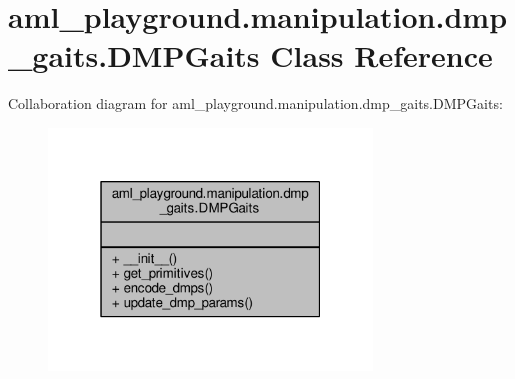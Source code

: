 \hypertarget{classaml__playground_1_1manipulation_1_1dmp__gaits_1_1_d_m_p_gaits}{\section{aml\-\_\-playground.\-manipulation.\-dmp\-\_\-gaits.\-D\-M\-P\-Gaits Class Reference}
\label{classaml__playground_1_1manipulation_1_1dmp__gaits_1_1_d_m_p_gaits}
}


Collaboration diagram for aml\-\_\-playground.\-manipulation.\-dmp\-\_\-gaits.\-D\-M\-P\-Gaits\-:
\nopagebreak
\begin{figure}[H]
\begin{center}
\leavevmode
\includegraphics[width=244pt]{classaml__playground_1_1manipulation_1_1dmp__gaits_1_1_d_m_p_gaits__coll__graph}
\end{center}
\end{figure}
